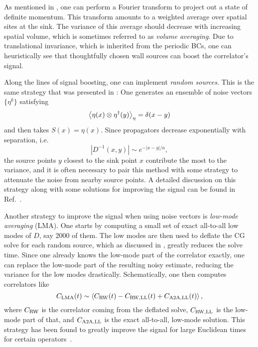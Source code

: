 As mentioned in , one can perform a Fourier transform
to project out a state of definite momentum. This transform amounts to a
weighted average over spatial sites at the sink. The variance of this average should
decrease with increasing spatial volume, which is sometimes referred to as {\it
volume averaging}. Due to translational invariance,
which is inherited from the periodic BCs, one can heuristically see that
thoughtfully chosen wall sources can boost the correlator's signal. 

Along the lines of signal boosting, one can implement {\it random
sources}. This is the same strategy that
was presented in : One generates an ensemble of noise
vectors $\{\eta^k\}$ satisfying
\begin{equation}
\ev{\eta(x)\otimes\eta^\dagger(y)}_\eta=\delta(x-y)
\end{equation}
and then takes $S(x)=\eta(x)$. 
Since propagators decrease exponentially with separation, i.e.
\begin{equation}
|D^{-1}(x,y)|\sim e^{-|x-y|/a},
\end{equation}
the source points $y$ closest to the sink point $x$ contribute the most to the
variance, and it is often necessary to pair this method with some strategy to
attenuate the noise from nearby source points.
A detailed discussion on this strategy along with some solutions for improving the
signal can be found in Ref.~\cite{Foley:2005ac}. 

Another strategy to improve the signal when using noise vectors is {\it low-mode
averaging} (LMA). One starts by computing a small set
of exact all-to-all low modes of $D$, say 2000 of them. The low modes are then 
used to deflate the CG solve for each random source, which as discussed in
, greatly reduces the solve time. Since one already knows
the low-mode part of the correlator exactly, one can replace the low-mode part
of the resulting noisy estimate, reducing the variance for the low modes
drastically. Schematically, one then computes correlators like
\begin{equation}
C_{\rm LMA}(t)\sim\ev{C_{\rm RW}(t)-C_{\rm RW,LL}(t)+C_{\rm A2A,LL}(t)},
\end{equation} 
where $C_{\rm RW}$ is the correlator coming from the deflated solve,
$C_{\rm RW,LL}$ is the low-mode part of that, and $C_{\rm A2A,LL}$ is the exact
all-to-all, low-mode solution. This strategy has been found to greatly improve
the signal for large Euclidean times for certain
operators~\cite{bazavov_hadronic_2025}.


